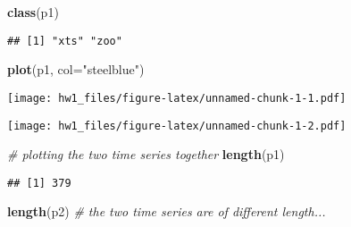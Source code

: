 \documentclass[
]{article}
\newenvironment{Shaded}{\begin{snugshade}}{\end{snugshade}}
\newcommand{\AttributeTok}[1]{\textcolor[rgb]{0.13,0.29,0.53}{#1}}
\newcommand{\CommentTok}[1]{\textcolor[rgb]{0.56,0.35,0.01}{\textit{#1}}}
\newcommand{\DecValTok}[1]{\textcolor[rgb]{0.00,0.00,0.81}{#1}}
\newcommand{\FunctionTok}[1]{\textcolor[rgb]{0.13,0.29,0.53}{\textbf{#1}}}
\newcommand{\NormalTok}[1]{#1}
\newcommand{\OtherTok}[1]{\textcolor[rgb]{0.56,0.35,0.01}{#1}}
\newcommand{\SpecialCharTok}[1]{\textcolor[rgb]{0.81,0.36,0.00}{\textbf{#1}}}
\newcommand{\StringTok}[1]{\textcolor[rgb]{0.31,0.60,0.02}{#1}}
\begin{document}
\begin{Shaded}
\begin{Highlighting}[]
\FunctionTok{class}\NormalTok{(p1)}
\end{Highlighting}
\end{Shaded}

\begin{verbatim}
## [1] "xts" "zoo"
\end{verbatim}

\begin{Shaded}
\begin{Highlighting}[]
\FunctionTok{plot}\NormalTok{(p1, }\AttributeTok{col=}\StringTok{"steelblue"}\NormalTok{)}
\end{Highlighting}
\end{Shaded}

\texttt{[image: hw1\_files/figure-latex/unnamed-chunk-1-1.pdf]}

\begin{Shaded}
\end{Shaded}

\texttt{[image: hw1\_files/figure-latex/unnamed-chunk-1-2.pdf]}

\begin{Shaded}
\begin{Highlighting}[]
\CommentTok{\# plotting the two time series together}
\FunctionTok{length}\NormalTok{(p1)}
\end{Highlighting}
\end{Shaded}

\begin{verbatim}
## [1] 379
\end{verbatim}

\begin{Shaded}
\begin{Highlighting}[]
\FunctionTok{length}\NormalTok{(p2) }\CommentTok{\# the two time series are of different length...}
\end{Highlighting}
\end{Shaded}
\end{document}
